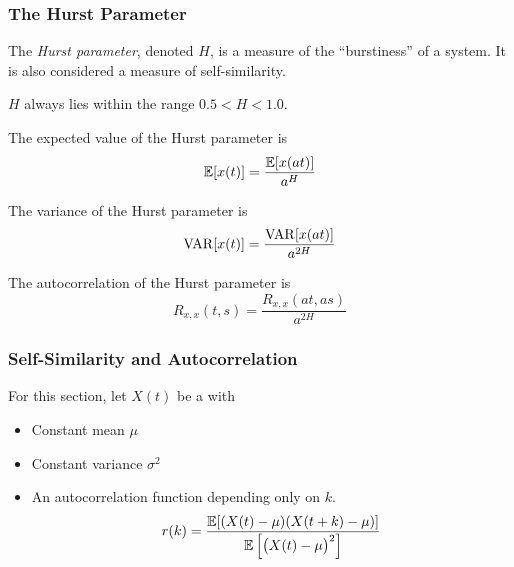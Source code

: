 \subsubsection{The Hurst Parameter}\label{subsubsec:The_Hurst_Parameter}
\begin{definition}\label{def:Hurst_Parameter}
  The \emph{Hurst parameter}, denoted $H$, is a measure of the ``burstiness'' of a system.
  It is also considered a measure of self-similarity.

  $H$ always lies within the range $0.5 < H < 1.0$.

  The expected value of the Hurst parameter is
  \begin{equation}\label{eq:Hurst_Parameter_Expected_Value}
    \operatorname{\operatorname{\mathbb{E}}}[x(t)] = \frac{\operatorname{\operatorname{\mathbb{E}}}[x(at)]}{a^{H}}
  \end{equation}

  The variance of the Hurst parameter is
  \begin{equation}\label{eq:Hurst_Parameter_Variance}
    \operatorname{\operatorname{VAR}}[x(t)] = \frac{\operatorname{\operatorname{VAR}}[x(at)]}{a^{2H}}
  \end{equation}

  The autocorrelation of the Hurst parameter is
  \begin{equation}\label{eq:Hurst_Parameter_Autocorrelation}
    R_{x, x}(t, s) = \frac{R_{x, x}(at, as)}{a^{2H}}
  \end{equation}
\end{definition}

\subsubsection{Self-Similarity and Autocorrelation}\label{subsubsec:Self_Similarity_Autocorrelation}
For this section, let $X(t)$ be a  with
\begin{itemize}[noitemsep]
\item Constant mean $\mu$
\item Constant variance $\sigma^{2}$
\item An autocorrelation function depending only on $k$.
  \begin{equation*}
    r(k) = \frac{\operatorname{\operatorname{\mathbb{E}}}[(X(t)-\mu)(X(t+k) - \mu)]}{\operatorname{\operatorname{\mathbb{E}}} \left[ {\bigl( X(t) - \mu \bigr)}^{2} \right]}
  \end{equation*}
\end{itemize}

